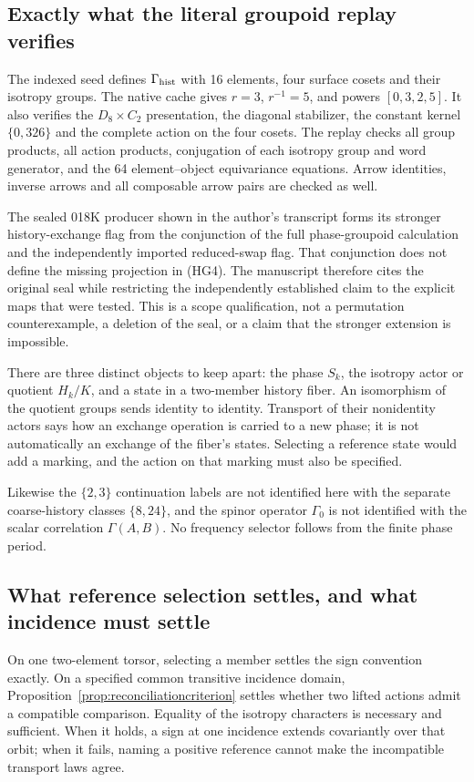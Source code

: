 \subsection{Exactly what the literal groupoid replay verifies}
The indexed seed defines $\Gamma_{\rm hist}$ with 16 elements, four surface cosets and their isotropy groups. The native cache gives $r=3$, $r^{-1}=5$, and powers $[0,3,2,5]$. It also verifies the $D_8\times C_2$ presentation, the diagonal stabilizer, the constant kernel $\{0,326\}$ and the complete action on the four cosets. The replay checks all group products, all action products, conjugation of each isotropy group and word generator, and the 64 element--object equivariance equations. Arrow identities, inverse arrows and all composable arrow pairs are checked as well.

The sealed 018K producer shown in the author's transcript forms its stronger history-exchange flag from the conjunction of the full phase-groupoid calculation and the independently imported reduced-swap flag. That conjunction does not define the missing projection in (HG4). The manuscript therefore cites the original seal  while restricting the independently established claim to the explicit maps that were tested. This is a scope qualification, not a permutation counterexample, a deletion of the seal, or a claim that the stronger extension is impossible.

There are three distinct objects to keep apart: the phase $S_k$, the isotropy actor or quotient $H_k/K$, and a state in a two-member history fiber. An isomorphism of the quotient groups sends identity to identity. Transport of their nonidentity actors says how an exchange operation is carried to a new phase; it is not automatically an exchange of the fiber's states. Selecting a reference state would add a marking, and the action on that marking must also be specified.

Likewise the $\{2,3\}$ continuation labels are not identified here with the separate coarse-history classes $\{8,24\}$, and the spinor operator $\Gamma_0$ is not identified with the scalar correlation $\Gamma(A,B)$. No frequency selector follows from the finite phase period.

\subsection{What reference selection settles, and what incidence must settle}
On one two-element torsor, selecting a member settles the sign convention exactly. On a specified common transitive incidence domain, Proposition~\ref{prop:reconciliationcriterion} settles whether two lifted actions admit a compatible comparison. Equality of the isotropy characters is necessary and sufficient. When it holds, a sign at one incidence extends covariantly over that orbit; when it fails, naming a positive reference cannot make the incompatible transport laws agree.

